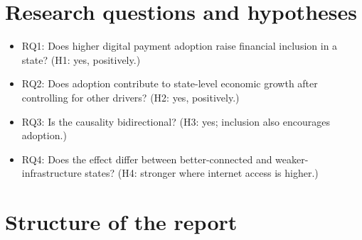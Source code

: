 \section{Research questions and hypotheses}
\begin{itemize}
\item RQ1: Does higher digital payment adoption raise financial inclusion in a state? (H1: yes, positively.)
\item RQ2: Does adoption contribute to state-level economic growth after controlling for other drivers? (H2: yes, positively.)
\item RQ3: Is the causality bidirectional? (H3: yes; inclusion also encourages adoption.)
\item RQ4: Does the effect differ between better-connected and weaker-infrastructure states? (H4: stronger where internet access is higher.)
\end{itemize}

\section{Structure of the report}
